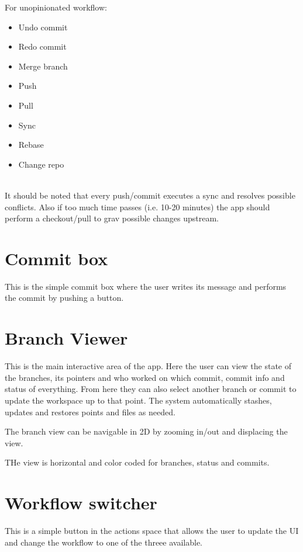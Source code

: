 \documentclass[GitEase.tex]{subfiles}
\begin{document}
For unopinionated workflow:

\begin{itemize}
    \item Undo commit
    \item Redo commit
    \item Merge branch
    \item Push
    \item Pull
    \item Sync
    \item Rebase
    \item Change repo
\end{itemize}\hfill\\

It should be noted that every push/commit executes a sync and resolves possible conflicts. Also if too much time passes (i.e. 10-20 minutes) the app should perform a checkout/pull to grav possible changes upstream.

\section{Commit box}

This is the simple commit box where the user writes its message and performs the commit by pushing a button.

\section{Branch Viewer}

This is the main interactive area of the app. Here the user can view the state of the branches, its pointers and who worked on which commit, commit info and status of everything.
From here they can also select another branch or commit to update the workspace up to that point.
The system automatically stashes, updates and restores points and files as needed.

The branch view can be navigable in 2D by zooming in/out and displacing the view.

THe view is horizontal and color coded for branches, status and commits.

\section{Workflow switcher}

This is a simple button in the actions space that allows the user to update the UI and change the workflow to one of the threee available.
\end{document}
